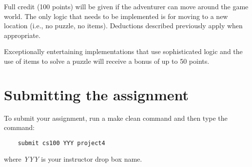\documentclass[12pt]{article}
\begin{document}
Full credit (100 points) will be given if 
the adventurer can move around the
game world. The only logic that needs to be implemented is
for moving to a new location (i.e., no puzzle, no items).
Deductions described previously apply when appropriate.

Exceptionally entertaining implementations that use sophisticated
logic and the use of items to solve a puzzle will receive a bonus of up
to 50 points.

\section*{Submitting the assignment}

To submit your assignment, run a make clean command and then type
the command:

\begin{verbatim}
    submit cs100 YYY project4
\end{verbatim}

where {\it YYY} is your instructor drop box name.
\end{document}
